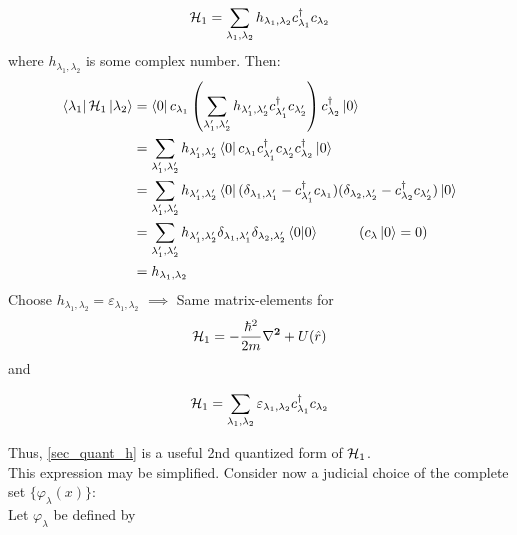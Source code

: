 \begin{equation}
	\mathcal{H}_1 = \sum_{\lambda_1, \lambda_2} h_{\lambda_1, \lambda_2} c^{\dagger}_{\lambda_1} c_{\lambda_2}
\end{equation}
where $ h_{\lambda_1, \lambda_2}$ is some complex number.
Then:
\begin{align}
	\bra{\lambda_1} \mathcal{H}_1 \ket{\lambda_2} &= \bra{0}c_{\lambda_1} \left(\sum_{\lambda'_1, \lambda'_2} h_{\lambda'_1, \lambda'_2} c^{\dagger}_{\lambda'_1} c_{\lambda'_2} \right) c^{\dagger}_{\lambda_2} \ket{0} \\
	&=\sum_{\lambda'_1, \lambda'_2} h_{\lambda'_1, \lambda'_2}  \bra{0}c_{\lambda_1}  c^{\dagger}_{\lambda'_1} c_{\lambda'_2} c^{\dagger}_{\lambda_2} \ket{0} \nonumber \\
	&= \sum_{\lambda'_1, \lambda'_2} h_{\lambda'_1, \lambda'_2}  \bra{0} (\delta_{\lambda_1, \lambda'_1}-c^{\dagger}_{\lambda'_1}c_{\lambda_1} ) (\delta_{\lambda_2, \lambda'_2} -c^{\dagger}_{\lambda_2} c_{\lambda'_2}) \ket{0} \nonumber\\
	&= \sum_{\lambda'_1, \lambda'_2} h_{\lambda'_1, \lambda'_2}  \delta_{\lambda_1, \lambda'_1} \delta_{\lambda_2, \lambda'_2} \braket{0}{0}\nonumber \hspace{1cm} (c_\lambda \ket{0} =0)  \\
	&= h_{\lambda_1, \lambda_2} \nonumber
\end{align}
Choose $ h_{\lambda_1, \lambda_2} = \varepsilon_{\lambda_1, \lambda_2}$ $\implies$ Same matrix-elements for
\begin{equation}
	\Ha_1 = -\frac{\hbar^2}{2m} \vb{\laplacian}+ U(\hat{r}) 
\end{equation}
and
\begin{tcolorbox}
	\begin{equation}
		\mathcal{H}_1 = \sum_{\lambda_1, \lambda_2} \varepsilon_{\lambda_1, \lambda_2} c^{\dagger}_{\lambda_1} c_{\lambda_2} \label{sec_quant_h}
	\end{equation}
\end{tcolorbox}
Thus, \ref{sec_quant_h} is a useful 2nd quantized form of $\mathcal{H}_1$.\\
\linebreak
\noindent This expression may be simplified. Consider now a judicial choice of the complete set $\{\varphi_\lambda(x) \}$:\\
\noindent Let ${\varphi_\lambda}$ be defined by

